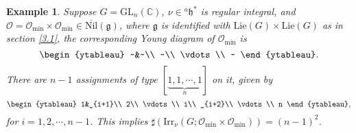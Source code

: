 \documentclass[12pt, a4paper]{amsart}
\numberwithin{equation}{section}
\newtheorem{examp}[thm]{Example}
\newcommand{\BC}{{\mathbb {C}}}
\newcommand{\CO}{{\mathcal {O}}}
\newcommand{\fg}{\mathfrak{g}}
\newcommand{\fh}{\mathfrak{h}}
\newcommand{\GL}{{\mathrm{GL}}}
\newcommand{\Irr}{{\mathrm{Irr}}}
\newcommand{\Lie}{{\mathrm{Lie}}}
\newcommand{\Nil}{{\mathrm{Nil}}}
\renewcommand{\bar}{\overline}
\begin{document}
\begin{examp}
    Suppose $G = \GL_n(\BC)$, $\nu \in {^{a}\fh^*}$ is regular integral, and $\CO = \CO_{\min} \times \CO_{\min} \in \bar{\Nil}(\fg)$, where $\fg$ is identified with $\Lie(G) \times \Lie(G)$ as in section \ref{3.1}, the corresponding Young diagram of $\CO_{\min}$ is
    \[
    \begin{ytableau}
        ~&~\\
        ~\\
        \vdots\\
        ~
    \end{ytableau}.
    \]
    There are $n-1$ assignments of type $[\underbrace{1,1,\cdots,1}_n]$ on it, given by
    \[
    \begin{ytableau}
        1&_{i+1}\\
        2\\
        \vdots\\
        i\\
        _{i+2}\\
        \vdots\\
        n
    \end{ytableau},
    \]
    for $i = 1,2,\cdots,n-1$.
    This implies $\sharp(\Irr_{\nu}(G;\CO_{\min} \times \CO_{\min})) = (n-1)^2$.
\end{examp}
\end{document}
